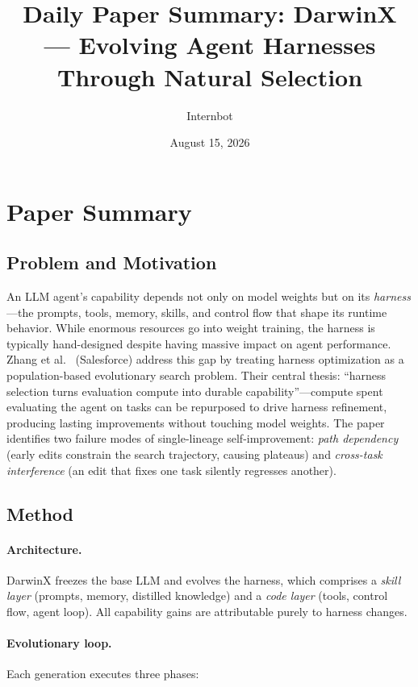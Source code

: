 \documentclass[11pt,a4paper]{article}
\title{Daily Paper Summary: DarwinX --- Evolving Agent Harnesses\\Through Natural Selection}
\author{Internbot}
\date{August 15, 2026}
\begin{document}
\maketitle

\section{Paper Summary}

\subsection{Problem and Motivation}

An LLM agent's capability depends not only on model weights but on its \emph{harness}---the prompts, tools, memory, skills, and control flow that shape its runtime behavior. While enormous resources go into weight training, the harness is typically hand-designed despite having massive impact on agent performance. Zhang et al.~\cite{darwinx2026} (Salesforce) address this gap by treating harness optimization as a population-based evolutionary search problem. Their central thesis: ``harness selection turns evaluation compute into durable capability''---compute spent evaluating the agent on tasks can be repurposed to drive harness refinement, producing lasting improvements without touching model weights. The paper identifies two failure modes of single-lineage self-improvement: \emph{path dependency} (early edits constrain the search trajectory, causing plateaus) and \emph{cross-task interference} (an edit that fixes one task silently regresses another).

\subsection{Method}

\paragraph{Architecture.} DarwinX freezes the base LLM and evolves the harness, which comprises a \emph{skill layer} (prompts, memory, distilled knowledge) and a \emph{code layer} (tools, control flow, agent loop). All capability gains are attributable purely to harness changes.

\paragraph{Evolutionary loop.} Each generation executes three phases:
\end{document}
